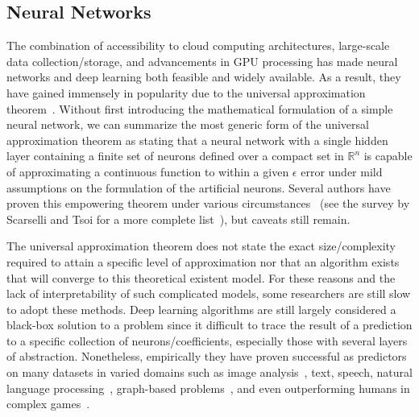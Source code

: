 \subsection{Neural Networks}

The combination of accessibility to cloud computing architectures, large-scale data collection/storage, and advancements in GPU processing has made neural networks and deep learning both feasible and widely available.
%
As a result, they have gained immensely in popularity due to the universal approximation theorem~\cite{Cybenko1989,Funahashi1989,Hecht-Nielsen1987,HornikStinchcombeWhite1989}.
%
Without first introducing the mathematical formulation of a simple neural network, we can summarize the most generic form of the universal approximation theorem as stating that a neural network with a single hidden layer containing a finite set of neurons defined over a compact set in $\mathbb{R}^n$ is capable of approximating a continuous function to within a given $\epsilon$ error under mild assumptions on the formulation of the artificial neurons.
%
Several authors have proven this empowering theorem under various circumstances~\cite{Hornik1991,Hornik1993,Huang2003,HuangBabri1998,IrieMiyake1988,Kurkova1992,LeshnoLinPinkus1993,ParkSandberg1991} (see the survey by Scarselli and Tsoi for a more complete list~\cite{ScarselliTsoi1998}), but caveats still remain.

The universal approximation theorem does not state the exact size/complexity required to attain a specific level of approximation nor that an algorithm exists that will converge to this theoretical existent model.
%
For these reasons and the lack of interpretability of such complicated models, some researchers are still slow to adopt these methods.
%
Deep learning algorithms are still largely considered a black-box solution to a problem since it difficult to trace the result of a prediction to a specific collection of neurons/coefficients, especially those with several layers of abstraction.
%
Nonetheless, empirically they have proven successful as predictors on many datasets in varied domains such as image analysis~\cite{Daugman1988,FarabetCouprieNajman2012,HadsellSermanetPierre2009,KrizhevskySutskeverHinton2017,MillertariNavabAhmadi2016,YasminSharifMohsin2013}, text, speech, natural language processing~\cite{BengioDucharmeVincent2003,GravesMohamedHinton2013,GravesWayneDanihelka2014,HochreiterSchmidhuber1997,MaPrincipe2018,SutskeverVinyalsLe2014,WestonBordesChopra2015}, graph-based problems~\cite{WuPanChen2019,ZhangCuiZhu2018,ZhouCuiZhang2018}, and even outperforming humans in complex games~\cite{MnihKavukcuogluSilver2013,SilverHuangMaddison2016}.

